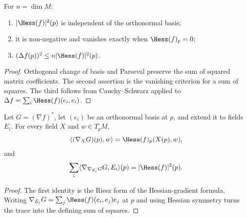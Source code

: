 \begin{lemma}
\label{lem:hessian-norm-sq-basic}
\leanok



For $n=\dim M$:
\begin{enumerate}
\item $|\Hess(f)|^2(p)$ is independent of the orthonormal basis;
\item it is non-negative and vanishes exactly when $\Hess(f)_p=0$;
\item $(\Delta f(p))^2\le n|\Hess(f)|^2(p)$.
\end{enumerate}
\end{lemma}
\begin{proof}
\sketch
{}
\leanok
Orthogonal change of basis and Parseval preserve the sum of squared
matrix coefficients. The second assertion is the vanishing criterion
for a sum of squares. The third follows from Cauchy--Schwarz applied to
$\Delta f=\sum_i\Hess(f)(e_i,e_i)$.
\end{proof}

\begin{lemma}
\label{lem:hessian-riesz-trace}



Let $G=(\nabla f)^*$, let $(e_i)$ be an orthonormal basis at $p$, and
extend it to fields $E_i$. For every field $X$ and $w\in T_pM$,
$$\langle(\nabla_XG)(p),w\rangle=\Hess(f)_p(X(p),w),$$
and
$$\sum_i\langle\nabla_{\nabla_{E_i}G}G,E_i\rangle(p)
=|\Hess(f)|^2(p).$$
\end{lemma}
\begin{proof}
\sketch
{}
\leanok
The first identity is the Riesz form of the Hessian-gradient formula.
Writing $\nabla_{E_i}G=\sum_j\Hess(f)(e_i,e_j)e_j$ at $p$ and using
Hessian symmetry turns the trace into the defining sum of squares.
\end{proof}

